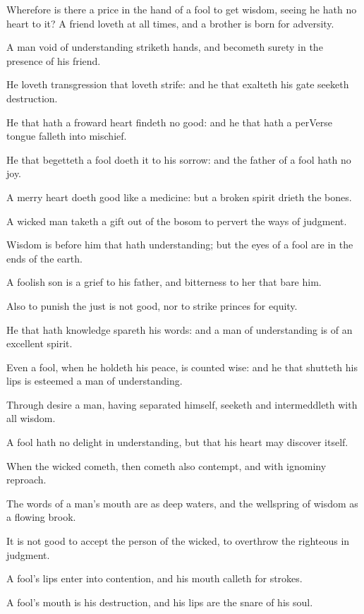 \Verse Wherefore is there a price in the hand of a fool to get wisdom, seeing he hath no heart to it?  \Verse A friend loveth at all times, and a brother is born for adversity.

\Verse A man void of understanding striketh hands, and becometh surety in the presence of his friend.

\Verse He loveth transgression that loveth strife: and he that exalteth his gate seeketh destruction.

\Verse He that hath a froward heart findeth no good: and he that hath a perVerse tongue falleth into mischief.

\Verse He that begetteth a fool doeth it to his sorrow: and the father of a fool hath no joy.

\Verse A merry heart doeth good like a medicine: but a broken spirit drieth the bones.

\Verse A wicked man taketh a gift out of the bosom to pervert the ways of judgment.

\Verse Wisdom is before him that hath understanding; but the eyes of a fool are in the ends of the earth.

\Verse A foolish son is a grief to his father, and bitterness to her that bare him.

\Verse Also to punish the just is not good, nor to strike princes for equity.

\Verse He that hath knowledge spareth his words: and a man of understanding is of an excellent spirit.

\Verse Even a fool, when he holdeth his peace, is counted wise: and he that shutteth his lips is esteemed a man of understanding.


\Chapter
\Verse Through desire a man, having separated himself, seeketh and intermeddleth with all wisdom.

\Verse A fool hath no delight in understanding, but that his heart may discover itself.

\Verse When the wicked cometh, then cometh also contempt, and with ignominy reproach.

\Verse The words of a man's mouth are as deep waters, and the wellspring of wisdom as a flowing brook.

\Verse It is not good to accept the person of the wicked, to overthrow the righteous in judgment.

\Verse A fool's lips enter into contention, and his mouth calleth for strokes.

\Verse A fool's mouth is his destruction, and his lips are the snare of his soul.

